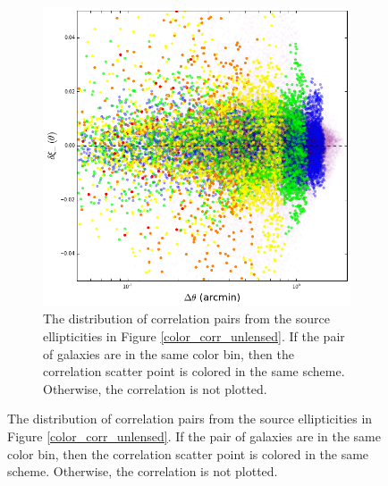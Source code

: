 \documentclass[%
 reprint,
 amsmath,amssymb,
 aps,nofootinbib
]{revtex4-1}
\begin{document}
\begin{figure}[b!]
\begin{subfigure}{0.45\textwidth}
        \includegraphics[width=\textwidth]{figs-swe/corr_dist_unlensed.png}
        \captionsetup{justification=raggedright,singlelinecheck=false}
        \caption{The distribution of correlation pairs from the source ellipticities in Figure \ref{color_corr_unlensed}. If the pair of galaxies are in the same color bin, then the correlation scatter point is colored in the same scheme. Otherwise, the correlation is not plotted.}
        \label{corr_dist_unlensed}
    \end{subfigure}


\end{figure}
\end{document}
